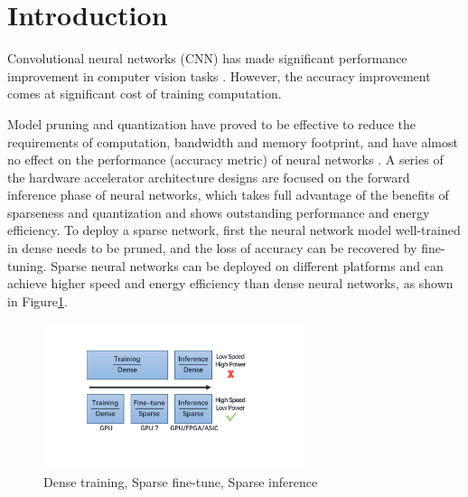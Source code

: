 \section{Introduction}\label{sec:introduction}


Convolutional neural networks (CNN) has made significant performance improvement in computer vision tasks \cite{He2016Deep, Shelhamer2017Fully}. However, the accuracy improvement comes at significant cost of training computation. 

Model pruning and quantization have proved to be effective to reduce the requirements of computation, bandwidth and memory footprint, and have almost no effect on the performance (accuracy metric) of neural networks \cite{RN173,RN159,han2015deep}. A series of the hardware accelerator architecture designs are focused on the forward inference phase of neural networks, which takes full advantage of the benefits of sparseness and quantization and shows outstanding performance and energy efficiency. To deploy a sparse network, first the neural network model well-trained in dense needs to be pruned, and the loss of accuracy can be recovered by fine-tuning. Sparse neural networks can be deployed on different platforms and can achieve higher speed and energy efficiency than dense neural networks, as shown in Figure\ref{fig:intro}.

\begin{figure}[htbp]
  \centering\includegraphics[width=3in]{figures/intro.pdf}
  \caption{Dense training, Sparse fine-tune, Sparse inference}\label{fig:intro}
\end{figure}

